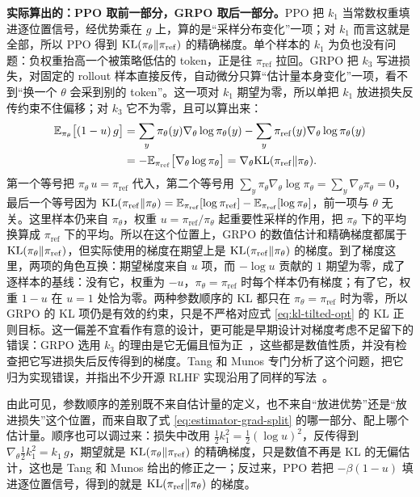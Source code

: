 \textbf{实际算出的：PPO 取前一部分，GRPO 取后一部分。}PPO 把 \(k_1\) 当常数权重填进逐位置信号，经优势乘在 \(g\) 上，算的是“采样分布变化”一项；对 \(k_1\) 而言这就是全部，所以 PPO 得到 \(\mathrm{KL}(\pi_\theta\Vert\pi_{\mathrm{ref}})\) 的精确梯度。单个样本的 \(k_1\) 为负也没有问题：负权重抬高一个被策略低估的 token，正是往 \(\pi_{\mathrm{ref}}\) 拉回。GRPO 把 \(k_3\) 写进损失，对固定的 rollout 样本直接反传，自动微分只算“估计量本身变化”一项，看不到“换一个 \(\theta\) 会采到别的 token”。这一项对 \(k_1\) 期望为零，所以单把 \(k_1\) 放进损失反传约束不住偏移；对 \(k_3\) 它不为零，且可以算出来：
\begin{equation}
\begin{aligned}
 \mathbb{E}_{\pi_\theta}\bigl[(1-u)\,g\bigr]
 &=\sum_y\pi_\theta(y)\nabla_\theta\log\pi_\theta(y)-\sum_y\pi_{\mathrm{ref}}(y)\nabla_\theta\log\pi_\theta(y)\\
 &=-\mathbb{E}_{\pi_{\mathrm{ref}}}\bigl[\nabla_\theta\log\pi_\theta\bigr]
 =\nabla_\theta\mathrm{KL}(\pi_{\mathrm{ref}}\Vert\pi_\theta).
\end{aligned}
 \label{eq:kl-grad-compare}
\end{equation}
第一个等号把 \(\pi_\theta\,u=\pi_{\mathrm{ref}}\) 代入，第二个等号用 \(\sum_y\pi_\theta\nabla_\theta\log\pi_\theta=\sum_y\nabla_\theta\pi_\theta=0\)，最后一个等号因为 \(\mathrm{KL}(\pi_{\mathrm{ref}}\Vert\pi_\theta)=\mathbb{E}_{\pi_{\mathrm{ref}}}[\log\pi_{\mathrm{ref}}]-\mathbb{E}_{\pi_{\mathrm{ref}}}[\log\pi_\theta]\)，前一项与 \(\theta\) 无关。这里样本仍来自 \(\pi_\theta\)，权重 \(u=\pi_{\mathrm{ref}}/\pi_\theta\) 起重要性采样的作用，把 \(\pi_\theta\) 下的平均换算成 \(\pi_{\mathrm{ref}}\) 下的平均。所以在这个位置上，GRPO 的数值估计和精确梯度都属于 \(\mathrm{KL}(\pi_\theta\Vert\pi_{\mathrm{ref}})\)，但实际使用的梯度在期望上是 \(\mathrm{KL}(\pi_{\mathrm{ref}}\Vert\pi_\theta)\) 的梯度。到了梯度这里，两项的角色互换：期望梯度来自 \(u\) 项，而 \(-\log u\) 贡献的 \(1\) 期望为零，成了逐样本的基线：没有它，权重为 \(-u\)，\(\pi_\theta=\pi_{\mathrm{ref}}\) 时每个样本仍有梯度；有了它，权重 \(1-u\) 在 \(u=1\) 处恰为零。两种参数顺序的 KL 都只在 \(\pi_\theta=\pi_{\mathrm{ref}}\) 时为零，所以 GRPO 的 KL 项仍是有效的约束，只是不严格对应式 \eqref{eq:kl-tilted-opt} 的 KL 正则目标。这一偏差不宜看作有意的设计，更可能是早期设计对梯度考虑不足留下的错误：GRPO 选用 \(k_3\) 的理由是它无偏且恒为正~\cite{shao2024grpo}，这些都是数值性质，并没有检查把它写进损失后反传得到的梯度。Tang 和 Munos 专门分析了这个问题，把它归为实现错误，并指出不少开源 RLHF 实现沿用了同样的写法~\cite{tang2025klpitfalls}。

由此可见，参数顺序的差别既不来自估计量的定义，也不来自“放进优势”还是“放进损失”这个位置，而来自取了式 \eqref{eq:estimator-grad-split} 的哪一部分、配上哪个估计量。顺序也可以调过来：损失中改用 \(\tfrac12k_1^2=\tfrac12(\log u)^2\)，反传得到 \(\nabla_\theta\tfrac12k_1^2=k_1\,g\)，期望就是 \(\mathrm{KL}(\pi_\theta\Vert\pi_{\mathrm{ref}})\) 的精确梯度，只是数值不再是 KL 的无偏估计，这也是 Tang 和 Munos 给出的修正之一；反过来，PPO 若把 \(-\beta(1-u)\) 填进逐位置信号，得到的就是 \(\mathrm{KL}(\pi_{\mathrm{ref}}\Vert\pi_\theta)\) 的梯度。

